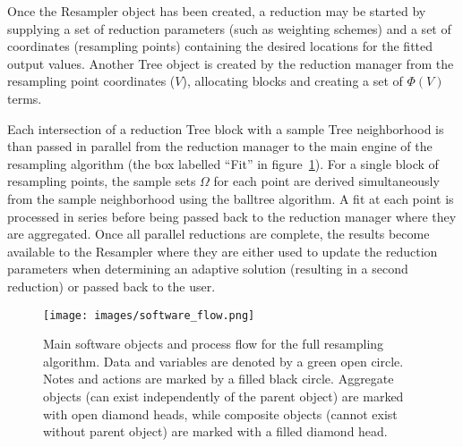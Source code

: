 Once the Resampler object has been created, a reduction may be started by
supplying a set of reduction parameters (such as weighting schemes) and a set
of coordinates (resampling points) containing the desired locations for the
fitted output values.
Another Tree object is created by the reduction manager from the resampling
point coordinates ($V$), allocating blocks and creating a set of $\Phi(V)$
terms.

Each intersection of a reduction Tree block with a sample Tree neighborhood is
than passed in parallel from the reduction manager to the main engine of the
resampling algorithm (the box labelled ``Fit'' in
figure~\ref{fig:software-flow}).
For a single block of resampling points, the sample sets $\Omega$ for each
point are derived simultaneously from the sample neighborhood using the
balltree algorithm.
A fit at each point is processed in series before being passed back to the
reduction manager where they are aggregated.
Once all parallel reductions are complete, the results become available to the
Resampler where they are either used to update the reduction parameters when
determining an adaptive solution (resulting in a second reduction) or passed
back to the user.

\begin{figure}[H]
  \begin{center}
  \texttt{[image: images/software\_flow.png]}
  \caption{Main software objects and process flow for the full resampling
           algorithm.  Data and variables are denoted by a green open circle.
           Notes and actions are marked by a filled black circle.  Aggregate
           objects (can exist independently of the parent object) are marked
           with open diamond heads, while composite objects (cannot exist
           without parent object) are marked with a filled diamond head.}
  \label{fig:software-flow}
  \end{center}
\end{figure}


